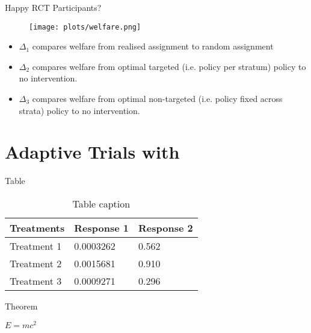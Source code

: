 \documentclass[aspectratio=169,xcolor=dvipsnames]{beamer}
\begin{document}
\begin{frame}{Happy RCT Participants?}

    \begin{figure}[htbp]
        \centering
       \texttt{[image: plots/welfare.png]} 
    \end{figure}

    \begin{itemize}
        \item $\Delta_1$ compares welfare from realised assignment to random assignment
        \item $\Delta_2$ compares welfare from optimal targeted (i.e. policy per stratum) policy to no intervention.
        \item $\Delta_3$ compares welfare from optimal non-targeted (i.e. policy fixed across strata) policy to no intervention.

    \end{itemize}
\end{frame}
\section{Adaptive Trials with}

\begin{frame}{Table}
    \begin{table}
        \begin{tabular}{l l l}
            \toprule
            \textbf{Treatments} & \textbf{Response 1} & \textbf{Response 2} \\
            \midrule
            Treatment 1         & 0.0003262           & 0.562               \\
            Treatment 2         & 0.0015681           & 0.910               \\
            Treatment 3         & 0.0009271           & 0.296               \\
            \bottomrule
        \end{tabular}
        \caption{Table caption}
    \end{table}
\end{frame}


\begin{frame}{Theorem}
    \begin{theorem}
        $E = mc^2$
    \end{theorem}
\end{frame}
\end{document}

